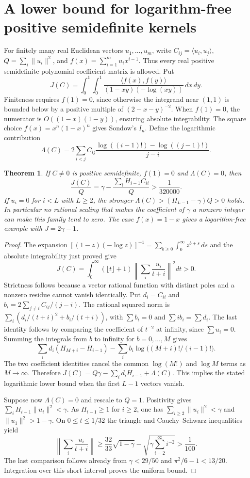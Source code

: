 \documentclass[11pt,a4paper,oneside,openany]{report}
\newtheorem{theorem}{Theorem}[section]
\theoremstyle{remark}\newtheorem{remark}[theorem]{Remark}
\numberwithin{equation}{section}
\begin{document}
\section{A lower bound for logarithm-free positive semidefinite kernels}
For finitely many real Euclidean vectors $u_1,\ldots,u_m$, write
$C_{ij}=\langle u_i,u_j\rangle$, $Q=\sum_i\|u_i\|^2$, and
$f(x)=\sum_{i=1}^m u_i x^{i-1}$. Thus every real positive semidefinite
polynomial coefficient matrix is allowed. Put
\[
 J(C)=\int_0^1\!\int_0^1\frac{\langle f(x),f(y)\rangle}
 {(1-xy)(-\log(xy))}\,dx\,dy.
\]
Finiteness requires $f(1)=0$, since otherwise the integrand near $(1,1)$
is bounded below by a positive multiple of $(2-x-y)^{-2}$.
When $f(1)=0$, the numerator is $O((1-x)(1-y))$, ensuring absolute
integrability. The square choice $f(x)=x^n(1-x)^n$ gives Sondow's $I_n$.
Define the logarithmic contribution
\[
 \Lambda(C)=2\sum_{i<j} C_{ij}
   \frac{\log((i-1)!)-\log((j-1)!)}{j-i}.
\]
\begin{theorem}\label{ch3:st:psd}
If $C\ne0$ is positive semidefinite, $f(1)=0$ and $\Lambda(C)=0$, then
\[
 \frac{J(C)}{Q}
    =\gamma-\frac{\sum_i H_{i-1} C_{ii}}{Q}
    >\frac{1}{320000}.
\]
If $u_i=0$ for $i<L$ with $L\ge2$, the stronger
$\Lambda(C)>(H_{L-1}-\gamma)Q>0$ holds. In particular no rational
scaling that makes the coefficient of $\gamma$ a nonzero integer can
make this family tend to zero. The case $f(x)=1-x$ gives a
logarithm-free example with $J=2\gamma-1$.
\end{theorem}
\begin{proof}
The expansion
$[(1-z)(-\log z)]^{-1}=\sum_{b\ge0}\int_0^\infty z^{b+s}\,ds$
and the absolute integrability just proved give
\[
 J(C)=\int_0^\infty(\lfloor t\rfloor+1)
          \left\|\sum_i\frac{u_i}{t+i}\right\|^2dt>0 .
\]
Strictness follows because a vector rational function with distinct poles
and a nonzero residue cannot vanish identically. Put $d_i=C_{ii}$ and
$b_i=2\sum_{j\ne i}C_{ij}/(j-i)$. The rational squared norm is
$\sum_i(d_i/(t+i)^2+b_i/(t+i))$, with $\sum b_i=0$ and
$\sum i b_i=\sum d_i$. The last identity follows by comparing the
coefficient of $t^{-2}$ at infinity, since $\sum u_i=0$.
Summing the integrals from $b$ to infinity for $b=0,\ldots,M$ gives
\[
 \sum_i d_i(H_{M+i}-H_{i-1})
 -\sum_i b_i\log\big((M+i)!/(i-1)!\big).
\]
The two coefficient identities cancel the common $\log(M!)$ and
$\log M$ terms as $M\to\infty$. Therefore
$J(C)=Q\gamma-\sum_i d_i H_{i-1}+\Lambda(C)$.
This implies the stated logarithmic lower bound when the first $L-1$
vectors vanish.

Suppose now $\Lambda(C)=0$ and rescale to $Q=1$.
Positivity gives $\sum_i H_{i-1}\|u_i\|^2<\gamma$. As $H_{i-1}\ge1$
for $i\ge2$, one has $\sum_{i\ge2}\|u_i\|^2<\gamma$ and
$\|u_1\|^2>1-\gamma$. On $0\le t\le 1/32$ the triangle and
Cauchy--Schwarz inequalities yield
\[
 \left\|\sum_i\frac{u_i}{t+i}\right\|
 \ge \frac{32}{33}\sqrt{1-\gamma}
       -\sqrt{\gamma\sum_{i=2}^\infty i^{-2}}>\frac1{100}.
\]
The last comparison follows already from
$\gamma<29/50$ and $\pi^2/6-1<13/20$.
Integration over this short interval proves the uniform bound.
\end{proof}
\end{document}

